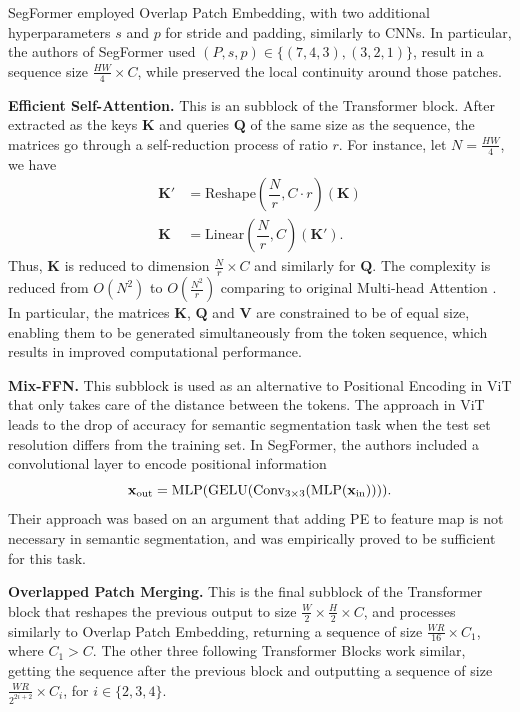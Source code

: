 SegFormer employed Overlap Patch Embedding, with two additional hyperparameters $s$ and $p$ for stride and padding, similarly to CNNs. In particular, the authors of SegFormer used $(P,s,p)\in\{(7,4,3), (3,2,1)\}$, result in a sequence size $\frac{HW}{4} \times C$, while preserved the local continuity around those patches.

\textbf{Efficient Self-Attention.} This is an subblock of the Transformer block. After extracted as the keys $\mathbf{K}$ and queries $\mathbf{Q}$ of the same size as the sequence, the matrices go through a self-reduction process of ratio $r$. For instance, let $N=\frac{HW}{4}$, we have
\begin{align*}
  \mathbf{K'} & = \mathrm{Reshape}\left(\dfrac{N}{r}, C\cdot r\right)(\mathbf{K}) \\
  \mathbf{K}  & = \mathrm{Linear}\left(\dfrac{N}{r}, C\right)(\mathbf{K'}).
\end{align*}
Thus, $\mathbf{K}$ is reduced to dimension $\frac{N}{r}\times C$ and similarly for $\mathbf{Q}$. The complexity is reduced from $O(N^2)$ to $O\left(\frac{N^2}{r}\right)$ comparing to original Multi-head Attention \cite{xie2021segformer}. In particular, the matrices $\mathbf{K}$, $\mathbf{Q}$ and $\mathbf{V}$ are constrained to be of equal size, enabling them to be generated simultaneously from the token sequence, which results in improved computational performance.

\textbf{Mix-FFN.} This subblock is used as an alternative to Positional Encoding in ViT that only takes care of the distance between the tokens. The approach in ViT leads to the drop of accuracy for semantic segmentation task when the test set resolution differs from the training set. In SegFormer, the authors included a convolutional layer to encode positional information
$$\mathbf{x}_{\mathrm{out}} = \mathrm{MLP}(\mathrm{GELU}(\mathrm{Conv_{3\times 3}(\mathrm{MLP}(\mathbf{x}_{in}))})).$$
Their approach was based on an argument that adding PE to feature map is not necessary in semantic segmentation, and was empirically proved to be sufficient for this task. 


\textbf{Overlapped Patch Merging.} This is the final subblock of the Transformer block that reshapes the previous output to size $\frac{W}{2}\times \frac{H}{2} \times C$, and processes similarly to Overlap Patch Embedding, returning a sequence of size $\frac{WR}{16}\times C_1$, where $C_1>C$. The other three following Transformer Blocks work similar, getting the sequence after the previous block and outputting a sequence of size $\frac{WR}{2^{2i+2}}\times C_i$, for $i\in\{2,3,4\}$.

